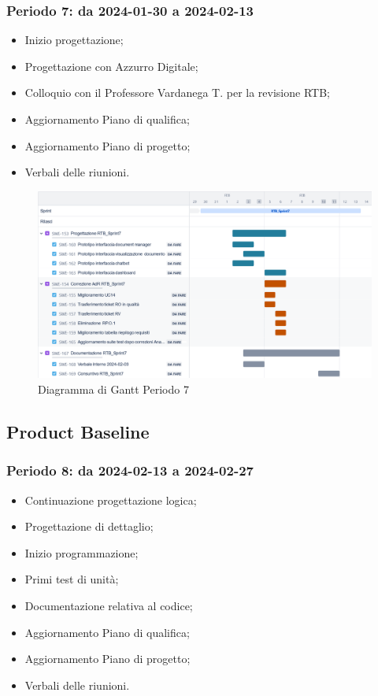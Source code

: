 \documentclass[10pt, a4paper]{article}
\begin{document}
\subsubsection{Periodo 7: da 2024-01-30 a 2024-02-13}
%
\begin{itemize}
    \item Inizio progettazione;
    \item Progettazione con Azzurro Digitale;
    \item Colloquio con il Professore Vardanega T. per la revisione RTB;
    \item Aggiornamento Piano di qualifica;
    \item Aggiornamento Piano di progetto;
    \item Verbali delle riunioni.
\end{itemize}
\begin{figure}[H]
    \centering        
    \includegraphics[width=15.5cm]{gantt/ganttPeriodo7.png}
    \caption{Diagramma di Gantt Periodo 7}
\end{figure}

\subsection{Product Baseline}

\subsubsection{Periodo 8: da 2024-02-13 a 2024-02-27}
%
\begin{itemize}
    \item Continuazione progettazione logica;
    \item Progettazione di dettaglio;
    \item Inizio programmazione;
    \item Primi test di unità;
    \item Documentazione relativa al codice;
    \item Aggiornamento Piano di qualifica;
    \item Aggiornamento Piano di progetto;
    \item Verbali delle riunioni.
\end{itemize}
\end{document}
